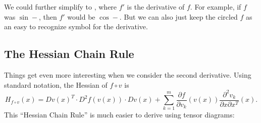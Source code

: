 We could further simplify  to , where $f'$ is the derivative of $f$.
For example, if $f$ was $\sin-$, then $f'$ would be $\cos-$.
But we can also just keep the circled $f$ as an easy to recognize symbol for the derivative.

\subsection{The Hessian Chain Rule}
Things get even more interesting when we consider the second derivative.
Using standard notation, the Hessian of $f\circ v$ is
\[
H_{f\circ v}(x) = Dv(x)^T \cdot D^2f(v(x)) \cdot Dv(x) + \sum_{k=1}^m \frac{\partial f}{\partial v_k}(v(x)) \frac{\partial^2 v_k}{\partial x \partial x^T}(x).
\]
This ``Hessian Chain Rule'' is much easier to derive using tensor diagrams:
